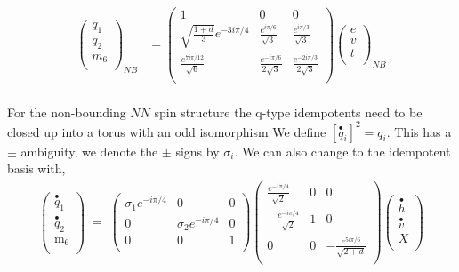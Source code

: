 \begin{align}
\left( \begin{matrix}
{q}_1\\
{q}_2\\
{m}_6\\
\end{matrix} \right)_{NB}
&= \left( \begin{matrix}
1 & 0 & 0 \\
\sqrt{\frac{1+d}{3}} e^{-3i \pi /4} & \frac{e^{i \pi /6}}{\sqrt{3}} & \frac{e^{i \pi /3}}{\sqrt{3}} \\
\frac{e^{7 i \pi /12}}{\sqrt{6}} & \frac{e^{- i \pi / 6}}{2 \sqrt{3}} & \frac{e^{-2 i \pi /3}}{2 \sqrt{3}}\\
\end{matrix} \right)
\left( \begin{matrix}
e\\
v\\
t\\
\end{matrix} \right)_{NB} \\
\end{align}

For the non-bounding $NN$ spin structure the q-type idempotents need to be closed up into a torus with an odd isomorphism
We define $\left[ \stackrel{\bullet}{q}_{i}\right]^2  = q_i$. 
This has a $\pm$ ambiguity, we denote the $\pm$ signs by $\sigma_i$. 
We can also change to the idempotent basis with,
\begin{align}
\label{VPP}
\left( \begin{matrix}
\stackrel{\bullet}{q}_{1}\\
\stackrel{\bullet}{q}_{2}\\
\text{m}_6 \\ 
\end{matrix} \right) \; =\;
\left( \begin{matrix}
\sigma_1 e^{- i \pi /4} &0&0\\
0&\sigma_2 e^{- i \pi /4} &0\\
0&0&1 \\
\end{matrix} \right)
\left( \begin{matrix}
\frac{e^{- i \pi /4}}{\sqrt{2}} & 0&0 \\
- \frac{e^{- i \pi /4}}{\sqrt{2}} & 1 & 0 \\
0 & 0& - \frac{e^{5 i \pi /6}}{\sqrt{2 + d}}\\
\end{matrix} \right)
\left( \begin{matrix}
\stackrel{\bullet}{h} \\
\stackrel{\bullet}{v} \\
X \\
\end{matrix} \right)
\end{align}

